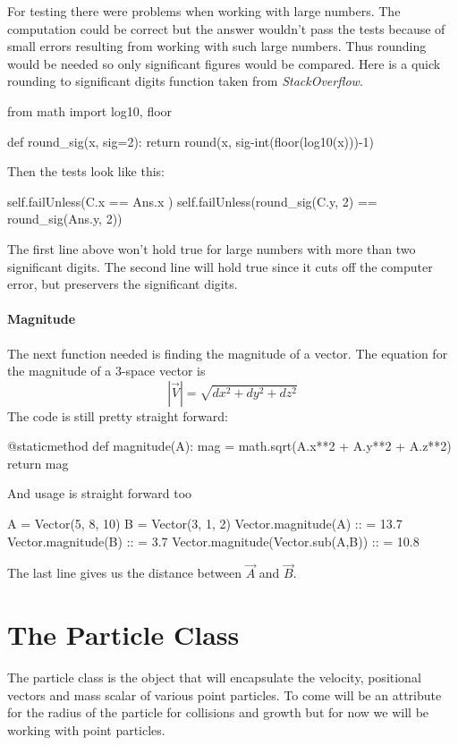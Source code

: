 \documentclass[15pt]{report}
\begin{document}
For testing there were problems when working with large numbers. The computation could be correct but the answer wouldn't pass the tests because of small errors resulting from working with such large numbers. Thus rounding would be needed so only significant figures would be compared. Here is a quick rounding to significant digits function taken from \textit{StackOverflow}\cite{indgar}.

\begin{code}
from math import log10, floor

def round_sig(x, sig=2):
   return round(x, sig-int(floor(log10(x)))-1)
\end{code}

Then the tests look like this:

\begin{code}
self.failUnless(C.x == Ans.x )            
self.failUnless(round_sig(C.y, 2) == round_sig(Ans.y, 2))
\end{code}

The first line above won't hold true for large numbers with more than two significant digits. The second line will hold true since it cuts off the computer error, but preservers the significant digits.
\paragraph{Magnitude} The next function needed is finding the magnitude of a vector. The equation for the magnitude of a 3-space vector is 
\begin{equation}
\left| \vec{V} \right|  = \sqrt{dx^2 + dy^2 + dz^2}
\end{equation}
The code is still pretty straight forward:

\begin{code}
@staticmethod
def magnitude(A):
   mag = math.sqrt(A.x**2 + A.y**2 + A.z**2)
   return mag
\end{code}

And usage is straight forward too

\begin{code}
A = Vector(5, 8, 10)
B = Vector(3, 1, 2)
Vector.magnitude(A)                 :: = 13.7
Vector.magnitude(B)                 :: = 3.7
Vector.magnitude(Vector.sub(A,B))  :: = 10.8
\end{code}

The last line gives us the distance between $\vec{A}$ and $\vec{B}$.

\section{The Particle Class}
The particle class is the object that will encapsulate the velocity, positional vectors and mass scalar of various point particles. To come will be an attribute for the radius of the particle for collisions and growth but for now we will be working with point particles.
\end{document}
